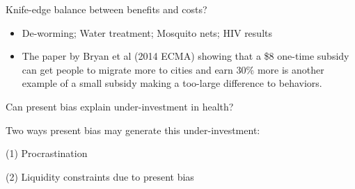 \documentclass[aspectratio=169, 10pt, handout]{beamer}
\newenvironment{wideitemize}{\itemize\addtolength{\itemsep}{10pt}}{\enditemize}
\begin{document}
\begin{frame}{Knife-edge balance between benefits and costs?}
{\begin{itemize}
        \item De-worming; Water treatment; Mosquito nets; HIV results

        \item The paper by Bryan et al (2014 ECMA) showing that a \$8 one-time subsidy can get people to migrate more to cities and earn 30\% more is another example of a small subsidy making a too-large difference to behaviors. 
    \end{itemize}
}

\end{frame}

\begin{frame}{Can present bias explain under-investment in health?}

\begin{wideitemize}

	\item Two ways present bias may generate this under-investment:

	\begin{wideitemize}

    \smallskip

		\item[(1)] Procrastination 

		\item[(2)] Liquidity constraints due to present bias

	\end{wideitemize}

\end{wideitemize}

\end{frame}
\end{document}
